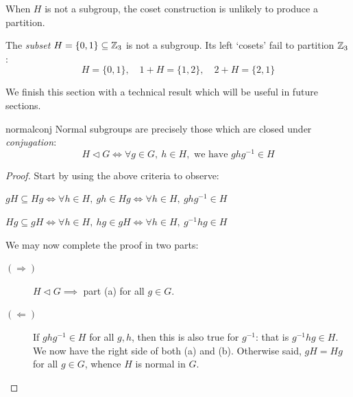 When $H$ is not a subgroup, the coset construction is unlikely to produce a partition.%

\begin{example}{}{}
	The \emph{subset} $H=\{0,1\}\subseteq\mathbb{Z}_3$ is not a subgroup. Its left `cosets' fail to partition $\mathbb{Z}_3$:
	\[H=\{0,1\},\quad 1+H=\{1,2\},\quad 2+H=\{2,1\}\]
\end{example}

We finish this section with a technical result which will be useful in future sections.

\begin{cor}{}{normalconj}
	Normal subgroups are precisely those which are closed under \emph{conjugation}:
  \[H\triangleleft G\iff \forall g\in G,\ h\in H,\text{ we have }ghg^{-1}\in H\]
\end{cor}

\begin{proof}
	Start by using the above criteria to observe:
	\begin{enumeratea}
	  \item $gH\subseteq Hg\iff \forall h\in H,\ gh\in Hg \iff \forall h\in H,\ ghg^{-1}\in H$
	  \item $Hg\subseteq gH\iff \forall h\in H,\ hg\in gH \iff \forall h\in H,\ g^{-1}hg\in H$
	\end{enumeratea}
	We may now complete the proof in two parts:
	\begin{description}
		\item[\normalfont $(\Rightarrow)$] $H\triangleleft G\implies$ part (a) for all $g\in G$. 
		\item[\normalfont $(\Leftarrow)$] If $ghg^{-1}\in H$ for all $g,h$, then this is also true for $g^{-1}$: that is $g^{-1}hg\in H$. We now have the right side of both (a) and (b). Otherwise said, $gH=Hg$ for all $g\in G$, whence $H$ is normal in $G$.\qedhere
	\end{description}
\end{proof}



